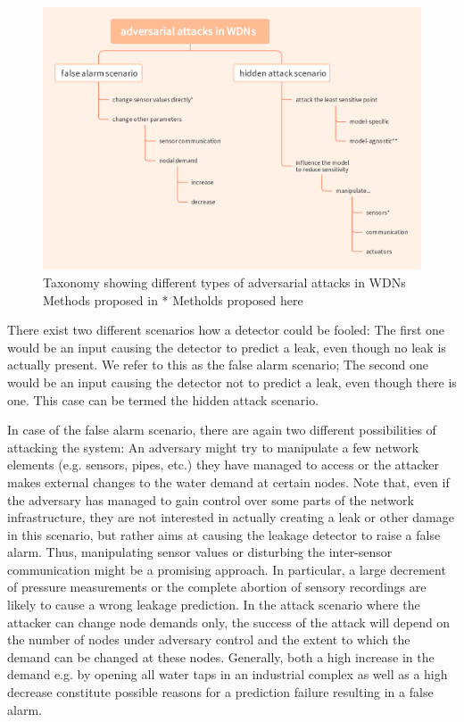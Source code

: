 \begin{figure}[h]
\centering
\includegraphics[height=\textheight,width=\textwidth,keepaspectratio=true]{Figures/adversarials_in_WDNs.png}
\caption{Taxonomy showing different types of adversarial attacks in WDNs
\newline * Methods proposed in \cite{conaml}
\newline ** Metholds proposed here}
\label{fig:adversarial_taxonomy}
\end{figure}

There exist two different scenarios how a detector could be fooled:
The first one would be an input causing the
detector to predict a leak, even though no leak is actually present.  We refer
to this as the false alarm scenario;
The second one would be an input causing
the detector not to predict a leak, even though there is one.  This case can
be termed the hidden attack scenario. 

In case of the false alarm scenario, there are again two different
possibilities of attacking the system: An adversary might try to manipulate a
few network elements (e.g. sensors, pipes, etc.) they have managed to access or the attacker makes
external changes to the water demand at certain nodes.  Note that, even if the
adversary has managed to gain control over some parts of the network
infrastructure, they are not interested in actually creating a leak or other
damage in this scenario, but rather aims at causing the leakage detector to
raise a false alarm. Thus, manipulating sensor values or disturbing the
inter-sensor communication might be a promising approach. In particular, a
large decrement of pressure measurements or the complete abortion of sensory
recordings are likely to cause a wrong leakage prediction. In the attack scenario where the attacker can change node demands only, the success of the attack will depend on the number of nodes under
adversary control and the extent to which the demand can be changed at these
nodes. Generally, both a high increase in the demand e.g. by opening all water
taps in an industrial complex as well as a high decrease constitute possible
reasons for a prediction failure resulting in a false alarm.

